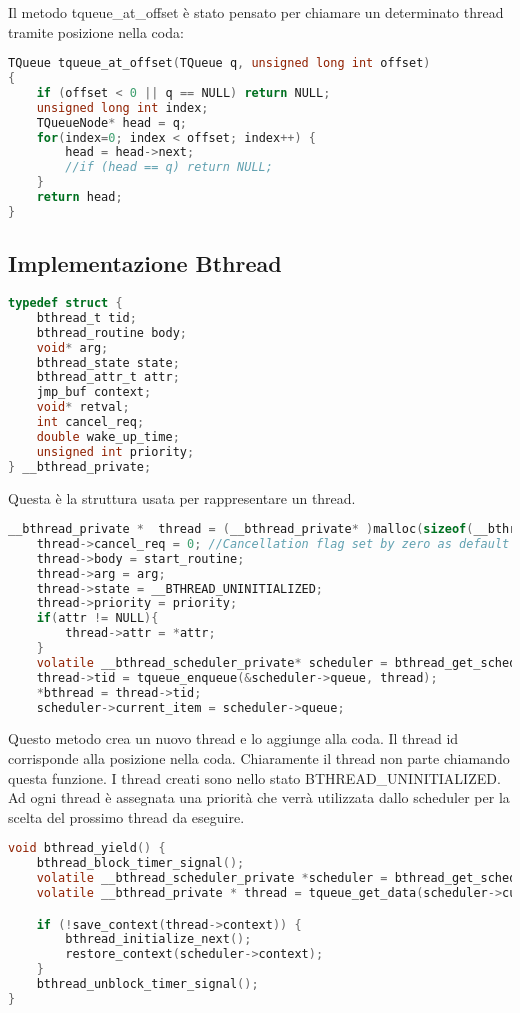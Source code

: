 \documentclass{article}
\begin{document}
\newpage
\noindent
Il metodo tqueue\_at\_offset è stato pensato per chiamare un determinato thread tramite posizione nella coda:

\begin{lstlisting}[language=C]
TQueue tqueue_at_offset(TQueue q, unsigned long int offset)
{
    if (offset < 0 || q == NULL) return NULL;
    unsigned long int index;
    TQueueNode* head = q;
    for(index=0; index < offset; index++) {
        head = head->next;
        //if (head == q) return NULL;
    }
    return head;
}
\end{lstlisting}
\subsection{Implementazione Bthread}
\vspace{2mm}
\begin{lstlisting}[language=C]
typedef struct {
    bthread_t tid;
    bthread_routine body;
    void* arg;
    bthread_state state;
    bthread_attr_t attr;
    jmp_buf context;
    void* retval;
    int cancel_req;
    double wake_up_time;
    unsigned int priority;
} __bthread_private;
\end{lstlisting}
\noindent Questa è la struttura usata per rappresentare un thread.

\begin{lstlisting}[language=C]
__bthread_private *  thread = (__bthread_private* )malloc(sizeof(__bthread_private));
    thread->cancel_req = 0; //Cancellation flag set by zero as default
    thread->body = start_routine;
    thread->arg = arg;
    thread->state = __BTHREAD_UNINITIALIZED;
    thread->priority = priority;
    if(attr != NULL){
        thread->attr = *attr;
    }
    volatile __bthread_scheduler_private* scheduler = bthread_get_scheduler();
    thread->tid = tqueue_enqueue(&scheduler->queue, thread);
    *bthread = thread->tid;
    scheduler->current_item = scheduler->queue;
\end{lstlisting}

\noindent Questo metodo crea un nuovo thread e lo aggiunge alla coda. Il thread id corrisponde alla posizione nella coda. Chiaramente il thread non parte chiamando questa funzione. I thread creati sono nello stato BTHREAD\_UNINITIALIZED. Ad ogni thread è assegnata una priorità che verrà utilizzata dallo scheduler per la scelta del prossimo thread da eseguire.

\begin{lstlisting}[language=C]
void bthread_yield() {
    bthread_block_timer_signal();
    volatile __bthread_scheduler_private *scheduler = bthread_get_scheduler();
    volatile __bthread_private * thread = tqueue_get_data(scheduler->current_item);

    if (!save_context(thread->context)) {
        bthread_initialize_next();
        restore_context(scheduler->context);
    }
    bthread_unblock_timer_signal();
}
\end{lstlisting}
\end{document}
